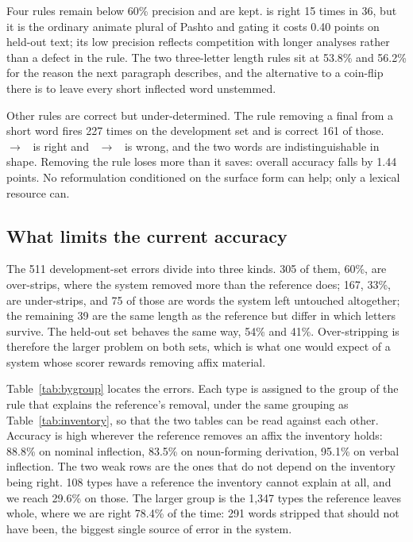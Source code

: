 \documentclass[conference]{IEEEtran}
\newcommand{\ps}[1]{{\pashtofont\textpashto{#1}}}
\begin{document}
Four rules remain below 60\% precision and are kept. \ps{ان} is right 15 times
in 36, but it is the ordinary animate plural of Pashto and gating it costs 0.40
points on held-out text; its low precision reflects competition with longer
analyses rather than a defect in the rule. The two three-letter length rules sit
at 53.8\% and 56.2\% for the reason the next paragraph describes, and the
alternative to a coin-flip there is to leave every short inflected word
unstemmed.

Other rules are correct but under-determined. The rule removing a final \ps{ه}
from a short word fires 227 times on the development set and is correct 161 of
those. \ps{لنډه}~$\rightarrow$~\ps{لنډ} is right and
\ps{خواړه}~$\rightarrow$~\ps{خواړ} is wrong, and the two words are
indistinguishable in shape. Removing the rule loses more than it saves: overall
accuracy falls by 1.44 points. No reformulation conditioned on the surface form
can help; only a lexical resource can.

\subsection{What limits the current accuracy}

The 511 development-set errors divide into three kinds. 305 of them, 60\%, are
over-strips, where the system removed more than the reference does; 167, 33\%,
are under-strips, and 75 of those are words the system left untouched
altogether; the remaining 39 are the same length as the reference but differ in
which letters survive. The held-out set behaves the same way, 54\% and 41\%.
Over-stripping is therefore the larger problem on both sets, which is what one
would expect of a system whose scorer rewards removing affix material.

Table~\ref{tab:bygroup} locates the errors. Each type is assigned to the group
of the rule that explains the reference's removal, under the same grouping as
Table~\ref{tab:inventory}, so that the two tables can be read against each
other. Accuracy is high wherever the reference removes an affix the inventory
holds: 88.8\% on nominal inflection, 83.5\% on noun-forming derivation,
95.1\% on verbal inflection. The two weak rows are the ones that do not
depend on the inventory being right. 108 types have a reference the inventory
cannot explain at all, and we reach 29.6\% on those. The larger group is the
1{,}347 types the reference leaves whole, where we are right 78.4\% of the
time: 291 words stripped that should not have been, the biggest single source
of error in the system.
\end{document}
